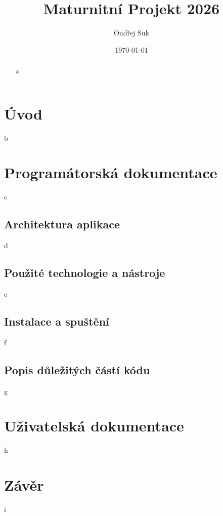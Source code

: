 \documentclass[12pt, a4paper, titlepage]{scrreprt}
\title{Maturnitní Projekt 2026} %
\author{Ondřej Suk}
\date{\today}
\begin{document}
\maketitle

\begin{abstract}
a
\end{abstract}

\tableofcontents
\clearpage

\chapter{Úvod}
b

\chapter{Programátorská dokumentace}
c

\section{Architektura aplikace}
d

\section{Použité technologie a nástroje}
e

\section{Instalace a spuštění}
f

\section{Popis důležitých částí kódu}
g

\chapter{Uživatelská dokumentace}
h

\chapter{Závěr}
i
\end{document}

